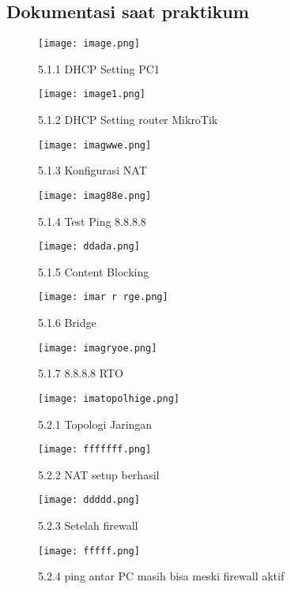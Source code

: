 \subsection{Dokumentasi saat praktikum}
\begin{figure}
    \centering
    \texttt{[image: image.png]}
    \caption{5.1.1 DHCP Setting PC1}
    \label{fig:enter-label}
\end{figure}
\begin{figure}
    \centering
    \texttt{[image: image1.png]}
    \caption{5.1.2 DHCP Setting router MikroTik}
    \label{fig:enter-label}
\end{figure}
\begin{figure}
    \centering
    \texttt{[image: imagwwe.png]}
    \caption{5.1.3 Konfigurasi NAT}
    \label{fig:enter-label}
\end{figure}
\begin{figure}
    \centering
    \texttt{[image: imag88e.png]}
    \caption{5.1.4 Test Ping 8.8.8.8}
    \label{fig:enter-label}
\end{figure}
\begin{figure}
    \centering
    \texttt{[image: ddada.png]}
    \caption{5.1.5 Content Blocking}
    \label{fig:enter-label}
\end{figure}
\begin{figure}
    \centering
    \texttt{[image: imar r rge.png]}
    \caption{5.1.6 Bridge}
    \label{fig:enter-label}
\end{figure}
\begin{figure}
    \centering
    \texttt{[image: imagryoe.png]}
    \caption{5.1.7 8.8.8.8 RTO}
    \label{fig:enter-label}
\end{figure}
\begin{figure}
    \centering
    \texttt{[image: imatopolhige.png]}
    \caption{5.2.1 Topologi Jaringan}
    \label{fig:enter-label}
\end{figure}
\begin{figure}
    \centering
    \texttt{[image: fffffff.png]}
    \caption{5.2.2 NAT setup berhasil}
    \label{fig:enter-label}
\end{figure}
\begin{figure}
    \centering
    \texttt{[image: ddddd.png]}
    \caption{5.2.3 Setelah firewall}
    \label{fig:enter-label}
\end{figure}
\begin{figure}
    \centering
    \texttt{[image: fffff.png]}
    \caption{5.2.4 ping antar PC masih bisa meski firewall aktif}
    \label{fig:enter-label}
\end{figure}

